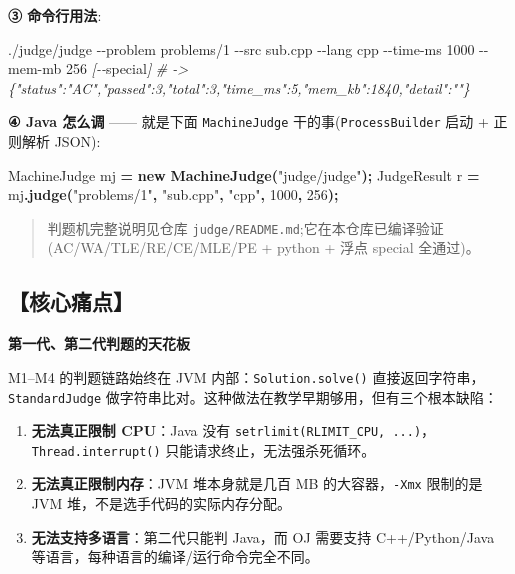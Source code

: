 \documentclass[
  11pt,
]{ctexart}
\newenvironment{Shaded}{\begin{snugshade}}{\end{snugshade}}
\newcommand{\AttributeTok}[1]{\textcolor[rgb]{0.13,0.29,0.53}{#1}}
\newcommand{\CommentTok}[1]{\textcolor[rgb]{0.56,0.35,0.01}{\textit{#1}}}
\newcommand{\DecValTok}[1]{\textcolor[rgb]{0.00,0.00,0.81}{#1}}
\newcommand{\ExtensionTok}[1]{#1}
\newcommand{\FunctionTok}[1]{\textcolor[rgb]{0.13,0.29,0.53}{\textbf{#1}}}
\newcommand{\KeywordTok}[1]{\textcolor[rgb]{0.13,0.29,0.53}{\textbf{#1}}}
\newcommand{\NormalTok}[1]{#1}
\newcommand{\OperatorTok}[1]{\textcolor[rgb]{0.81,0.36,0.00}{\textbf{#1}}}
\newcommand{\PreprocessorTok}[1]{\textcolor[rgb]{0.56,0.35,0.01}{\textit{#1}}}
\newcommand{\SpecialStringTok}[1]{\textcolor[rgb]{0.31,0.60,0.02}{#1}}
\newcommand{\StringTok}[1]{\textcolor[rgb]{0.31,0.60,0.02}{#1}}
\providecommand{\tightlist}{%
  \setlength{\itemsep}{0pt}\setlength{\parskip}{0pt}}
\begin{document}
\textbf{③ 命令行用法}:

\begin{Shaded}
\begin{Highlighting}[]
\ExtensionTok{./judge/judge} \AttributeTok{{-}{-}problem}\NormalTok{ problems/1 }\AttributeTok{{-}{-}src}\NormalTok{ sub.cpp }\AttributeTok{{-}{-}lang}\NormalTok{ cpp }\AttributeTok{{-}{-}time{-}ms}\NormalTok{ 1000 }\AttributeTok{{-}{-}mem{-}mb}\NormalTok{ 256 }\PreprocessorTok{[{-}{-}}\SpecialStringTok{special}\PreprocessorTok{]}
\CommentTok{\# {-}\textgreater{} \{"status":"AC","passed":3,"total":3,"time\_ms":5,"mem\_kb":1840,"detail":""\}}
\end{Highlighting}
\end{Shaded}

\textbf{④ Java 怎么调} ------ 就是下面 \texttt{MachineJudge}
干的事(\texttt{ProcessBuilder} 启动 + 正则解析 JSON):

\begin{Shaded}
\begin{Highlighting}[]
\NormalTok{MachineJudge mj }\OperatorTok{=} \KeywordTok{new} \FunctionTok{MachineJudge}\OperatorTok{(}\StringTok{"judge/judge"}\OperatorTok{);}
\NormalTok{JudgeResult r }\OperatorTok{=}\NormalTok{ mj}\OperatorTok{.}\FunctionTok{judge}\OperatorTok{(}\StringTok{"problems/1"}\OperatorTok{,} \StringTok{"sub.cpp"}\OperatorTok{,} \StringTok{"cpp"}\OperatorTok{,} \DecValTok{1000}\OperatorTok{,} \DecValTok{256}\OperatorTok{);}
\end{Highlighting}
\end{Shaded}

\begin{quote}
判题机完整说明见仓库
\texttt{judge/README.md};它在本仓库已编译验证(AC/WA/TLE/RE/CE/MLE/PE +
python + 浮点 special 全通过)。
\end{quote}

\hypertarget{ux6838ux5fc3ux75dbux70b9-1}{%
\subsection{【核心痛点】}\label{ux6838ux5fc3ux75dbux70b9-1}}

\textbf{第一代、第二代判题的天花板}

M1--M4 的判题链路始终在 JVM 内部：\texttt{Solution.solve()}
直接返回字符串，\texttt{StandardJudge}
做字符串比对。这种做法在教学早期够用，但有三个根本缺陷：

\begin{enumerate}
\def\labelenumi{\arabic{enumi}.}
\tightlist
\item
  \textbf{无法真正限制 CPU}：Java 没有
  \texttt{setrlimit(RLIMIT\_CPU,\ ...)}，\texttt{Thread.interrupt()}
  只能请求终止，无法强杀死循环。
\item
  \textbf{无法真正限制内存}：JVM 堆本身就是几百 MB
  的大容器，\texttt{-Xmx} 限制的是 JVM 堆，不是选手代码的实际内存分配。
\item
  \textbf{无法支持多语言}：第二代只能判 Java，而 OJ 需要支持
  C++/Python/Java 等语言，每种语言的编译/运行命令完全不同。
\end{enumerate}
\end{document}
